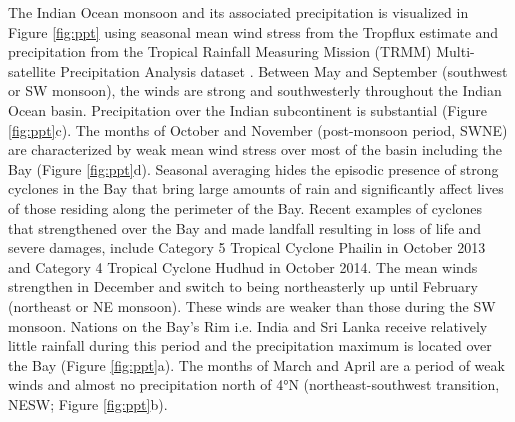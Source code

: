 \documentclass[onecol]{ametsoc}
\begin{document}
The Indian Ocean monsoon and its associated precipitation is visualized in Figure \ref{fig:ppt} using seasonal mean wind stress from the Tropflux estimate \citep{Kumar2012} and precipitation from the Tropical Rainfall Measuring Mission (TRMM) Multi-satellite Precipitation Analysis dataset \citep{trmm}.
Between May and September (southwest or SW monsoon), the winds are strong and southwesterly throughout the Indian Ocean basin.
Precipitation over the Indian subcontinent is substantial (Figure \ref{fig:ppt}c).
The months of October and November (post-monsoon period, SWNE) are characterized by weak mean wind stress over most of the basin including the Bay (Figure \ref{fig:ppt}d). 
Seasonal averaging hides the episodic presence of strong cyclones in the Bay that bring large amounts of rain and significantly affect lives of those residing along the perimeter of the Bay.
Recent examples of cyclones that strengthened over the Bay and made landfall resulting in loss of life and severe damages, include Category 5 Tropical Cyclone Phailin in October 2013 and Category 4 Tropical Cyclone Hudhud in October 2014.
The mean winds strengthen in December and switch to being northeasterly up until February (northeast or NE monsoon).
These winds are weaker than those during the SW monsoon.
Nations on the Bay's Rim i.e. India and Sri Lanka receive relatively little rainfall during this period and the precipitation maximum is located over the Bay (Figure \ref{fig:ppt}a).
The months of March and April are a period of weak winds and almost no precipitation north of 4°N (northeast-southwest transition, NESW; Figure \ref{fig:ppt}b).
\end{document}
